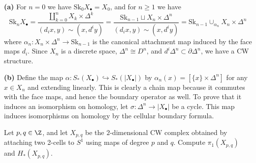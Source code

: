 \documentclass[11pt,letterpaper]{article}
\providecommand{\Sk}{\text{Sk}}
\begin{document}
\begin{solution}
    \textbf{(a)} For $n=0$ we have $\Sk_0 X_\bullet = X_0$, and for $n\geq 1$ we have
    \[
        \Sk_n X_\bullet = \frac{\coprod_{k=0}^n X_k\times \Delta^k}{(d_ix,y)\sim (x, d^iy)} = \frac{\Sk_{n-1}\sqcup X_n\times \Delta^n}{(d_ix,y) \sim (x,d^iy)} = \Sk_{n-1}\cup_{\alpha_n} X_n\times \Delta^n
    \]
    where $\alpha_n : X_n\times \Delta^n \to \Sk_{n-1}$ is the canonical attachment map induced by the face maps $d_i$. Since $X_n$ is a discrete space, $\Delta^n\cong D^n$, and $d^i \Delta^n \subset \partial \Delta^n$, we have a CW structure.

    \textbf{(b)} Define the map $\alpha : S_*(X_\bullet) \hookrightarrow S_*(|X_\bullet|)$ by $\alpha_n(x)=[\{x\}\times \Delta^n]$ for any $x\in X_n$ and extending linearly. This is clearly a chain map because it commutes with the face maps, and hence the boundary operator as well. To prove that it induces an isomorphism on homology, let $\sigma : \Delta^n \to |X_\bullet|$ be a cycle. This map induces isomorphisms on homology by the cellular boundary formula.
\end{solution}

\begin{problem}
    Let $p, q \in \Z$, and let $X_{p,q}$ be the $2$-dimensional CW complex obtained by attaching two 2-cells to $S^1$ using maps of degree $p$ and $q$. Compute $\pi_1(X_{p,q})$ and $H_*(X_{p,q})$.
\end{problem}
\end{document}
